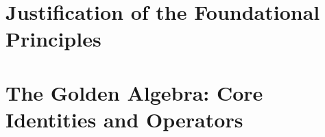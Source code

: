 \documentclass[12pt, a4paper]{article}
\begin{document}

\maketitle
\newpage


\newpage

\part{Justification of the Foundational Principles}

\newpage

\newpage

\newpage

\newpage
\part{The Golden Algebra: Core Identities and Operators}

\newpage


\newpage

\newpage

\newpage

\newpage

\newpage

\newpage

\newpage

\newpage

\newpage

\newpage

\end{document}

